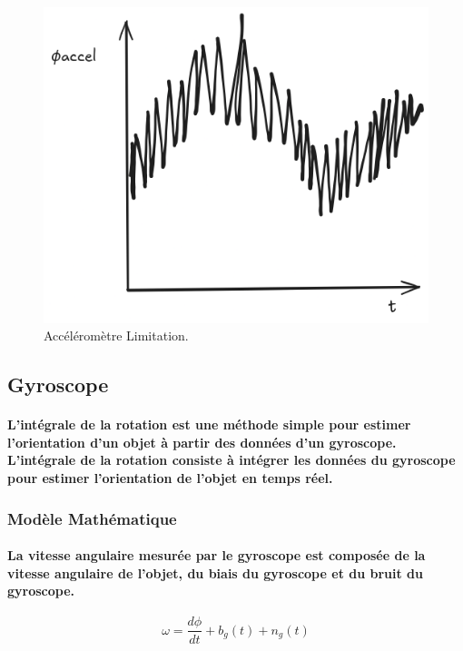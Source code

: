 \begin{figure}[!htpb]
	\centering
	\includegraphics[width=0.7\linewidth]{Figures/accel-limits.png}
	\caption{Accéléromètre Limitation.}
\end{figure}

\paragraph{}
\subsection{Gyroscope}

\paragraph{L'intégrale de la rotation est une méthode simple pour estimer l'orientation d'un objet à partir des données d'un gyroscope. L'intégrale de la rotation consiste à intégrer les données du gyroscope pour estimer l'orientation de l'objet en temps réel.}

\subsubsection{Modèle Mathématique}

\paragraph{La vitesse angulaire mesurée par le gyroscope est composée de la vitesse angulaire de l'objet, du biais du gyroscope et du bruit du gyroscope.}

\begin{equation}
	\omega = \frac{d\phi}{dt} + b_g(t) + n_g(t)
\end{equation}


